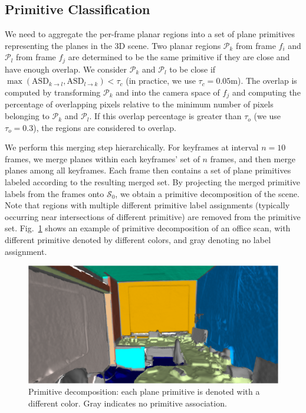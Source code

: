\subsection{Primitive Classification}
\label{subsec:3dlite-plane-classify}

We need to aggregate the per-frame planar regions into a set of plane primitives representing the planes in the 3D scene.
Two planar regions $\mathcal{P}_k$ from frame $f_i$ and $\mathcal{P}_l$ from frame $f_j$ are determined to be the same primitive if they are close and have enough overlap. 
We consider $\mathcal{P}_k$ and $\mathcal{P}_l$ to be close if $\max(\textrm{ASD}_{k\rightarrow l}, \textrm{ASD}_{l\rightarrow k}) < \tau_c$ (in practice, we use $\tau_c = 0.05$m).
The overlap is computed by transforming $\mathcal{P}_k$ and into the camera space of $f_j$ and computing the percentage of overlapping pixels relative to the minimum number of pixels belonging to $\mathcal{P}_k$ and $\mathcal{P}_l$.
If this overlap percentage is greater than $\tau_o$ (we use $\tau_o = 0.3$), the regions are considered to overlap.

We perform this merging step hierarchically.
For keyframes at interval $n = 10$ frames, we merge planes within each keyframes' set of $n$ frames, and then merge planes among all keyframes.
Each frame then contains a set of plane primitives labeled according to the resulting merged set.
By projecting the merged primitive labels from the frames onto $\mathcal{S}_0$, we obtain a primitive decomposition of the scene. 
Note that regions with multiple different primitive label assignments (typically occurring near intersections of different primitive) are removed from the primitive set.
Fig.~\ref{fig:3dlite-plane-classify} shows an example of primitive decomposition of an office scan, with different primitive denoted by different colors, and gray denoting no label assignment.
 
\begin{figure}
    \centering
    \includegraphics[width=0.97\linewidth]{3dlite/fig3.png}
    \caption{
        Primitive decomposition: each plane primitive is denoted with a different color. Gray indicates no primitive association.
    }
    \label{fig:3dlite-plane-classify}

\end{figure}


